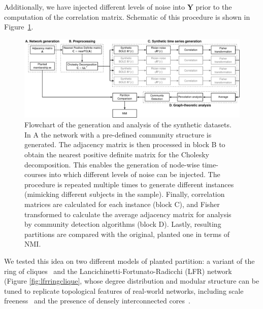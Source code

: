 Additionally, we have injected different levels of noise into $\mathbf{Y}$ prior to the computation of the correlation matrix. Schematic of this procedure is shown in Figure~\ref{fig:flowchart}.

\begin{figure}
\centering
\includegraphics[height=0.39\textheight]{images/flowchart.pdf}
\caption{Flowchart of the generation and analysis of the synthetic datasets. In A the network with a pre-defined community structure is generated. The adjacency matrix is then processed in block B to obtain the nearest positive definite matrix for the Cholesky decomposition. This enables the generation of node-wise time-courses into which different levels of noise can be injected. The procedure is repeated multiple times to generate different instances (mimicking different subjects in the sample). Finally, correlation matrices are calculated for each instance (block C), and Fisher transformed to calculate the average adjacency matrix for analysis by community detection algorithms (block D). Lastly, resulting partitions are compared with the original, planted one in terms of NMI.}
\label{fig:flowchart}
\end{figure}

We tested this idea on two different models of planted partition: a variant of the ring of cliques~\cite{fortunato2007} and the Lancichinetti-Fortunato-Radicchi (LFR) network~\cite{lancichinetti2008} (Figure \ref{fig:lfrringclique}, whose degree distribution and modular structure can be tuned to replicate topological features of real-world networks, including scale freeness~\cite{hagmann2008} and the presence of densely interconnected cores~\cite{vandenheuvel2011}.


